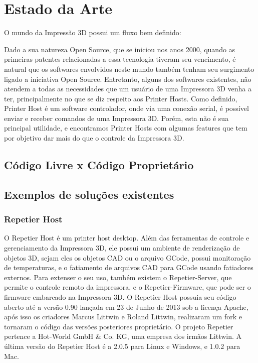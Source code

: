 \section{Estado da Arte}
O mundo da Impressão 3D possui um fluxo bem definido: 



Dado a sua natureza Open Source, que se iniciou nos anos 2000, quando as primeiras patentes relacionadas a essa tecnologia tiveram seu vencimento, é natural que os softwares envolvidos neste mundo também tenham seu surgimento ligado a iniciativa Open Source.
Entretanto, alguns dos softwares existentes, não atendem a todas as necessidades que um usuário de uma Impressora 3D venha a ter, principalmente no que se diz respeito aos Printer Hosts.
Como definido, Printer Host é um software controlador, onde via uma conexão serial, é possível enviar e receber comandos de uma Impressora 3D. Porém, esta não é sua principal utilidade, e encontramos Printer Hosts com algumas features que tem por objetivo dar mais do que o controle da Impressora 3D.

\subsection{Código Livre x Código Proprietário}

\subsection{Exemplos de soluções existentes}

\subsubsection{Repetier Host}
O Repetier Host é um printer host desktop. Além das
ferramentas de controle e gerenciamento da Impressora 3D, ele 
possui um ambiente de renderização de objetos 3D, sejam eles 
os objetos CAD ou o arquivo GCode, possui monitoração de 
temperaturas, e o fatiamento de arquivos CAD para GCode 
usando fatiadores externos. Para extenser o seu uso, também 
existem o Repetier-Server, que permite o controle remoto da 
impressora, e o Repetier-Firmware, que pode ser o firmware 
embarcado na Impressora 3D. O Repetier Host possuia seu 
código aberto até a versão 0.90 lançada em 23 de Junho de 
2013 sob a licença Apache, após isso os criadores Marcus 
Littwin e Roland Littwin, realizaram um fork e tornaram o 
código das versões posteriores proprietário. O projeto 
Repetier pertence a Hot-World GmbH \& Co. KG, uma empresa dos 
irmãos Littwin. A última versão do Repetier Host é a 2.0.5 
para Linux e Windows, e 1.0.2 para Mac.
\iffalse
Referências:
- 0.90 codigo: https://github.com/repetier/Repetier-Host
- Licença: https://github.com/repetier/Repetier-Host/blob/master/APACHE-LICENSE-2.0.txt
- Author: https://www.repetier.com/about-us/
- Versão: https://www.repetier.com/download-now/
\fi

